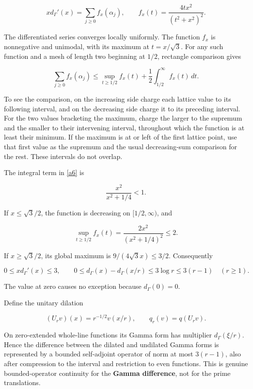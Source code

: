 \documentclass[11pt]{article}
\begin{document}
\begin{equation}\label{a5}
x d_\Gamma'(x)=\sum_{j\ge0}f_x(\alpha_j),
\qquad f_x(t)=\frac{4t x^2}{(t^2+x^2)^2}.
\end{equation}

The differentiated series converges locally uniformly. The function \(f_x\) is nonnegative and unimodal, with its maximum at \(t=x/\sqrt3\). For any such function and a mesh of length two beginning at \(1/2\), rectangle comparison gives

\begin{equation}\label{a6}
\sum_{j\ge0}f_x(\alpha_j)
 \le \sup_{t\ge1/2}f_x(t)
       +\frac12\int_{1/2}^{\infty}f_x(t)\,dt.
\end{equation}

To see the comparison, on the increasing side charge each lattice value to its following interval, and on the decreasing side charge it to its preceding interval. For the two values bracketing the maximum, charge the larger to the supremum and the smaller to their intervening interval, throughout which the function is at least their minimum. If the maximum is at or left of the first lattice point, use that first value as the supremum and the usual decreasing-sum comparison for the rest. These intervals do not overlap.

The integral term in \eqref{a6} is

\[
\frac{x^2}{x^2+1/4}<1.
\]

If \(x\le\sqrt3/2\), the function is decreasing on \([1/2,\infty)\), and

\[
\sup_{t\ge1/2}f_x(t)=\frac{2x^2}{(x^2+1/4)^2}\le2.
\]

If \(x\ge\sqrt3/2\), its global maximum is
\(9/(4\sqrt3 x)\le3/2\). Consequently

\begin{equation}\label{a7}
0\le x d_\Gamma'(x)\le3,
\qquad
0\le d_\Gamma(x)-d_\Gamma(x/r)
 \le3\log r\le3(r-1)\quad(r\ge1).
\end{equation}

The value at zero causes no exception because \(d_\Gamma(0)=0\).

Define the unitary dilation

\[
(U_rv)(x)=r^{-1/2}v(x/r),\qquad q_r(v)=q(U_rv).
\]

On zero-extended whole-line functions its Gamma form has multiplier \(d_\Gamma(\xi/r)\). Hence the difference between the dilated and undilated Gamma forms is represented by a bounded self-adjoint operator of norm at most \(3(r-1)\), also after compression to the interval and restriction to even functions. This is genuine bounded-operator continuity for the \textbf{Gamma difference}, not for the prime translations.
\end{document}
